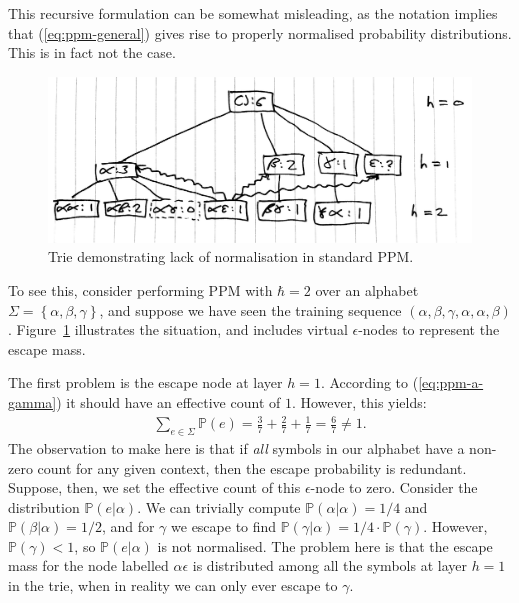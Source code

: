 \documentclass[12pt,a4paper,twoside,openright]{report}
\newcommand{\set}[1]{ \left\{ #1 \right\} }
\begin{document}
This recursive formulation can be somewhat misleading, as the notation implies
that (\ref{eq:ppm-general}) gives rise to properly normalised probability
distributions. This is in fact not the case. 

\begin{figure}[H]
\centering
\includegraphics[width=400pt]{figs/problematic_trie_tmp.jpg}
\caption{Trie demonstrating lack of normalisation in standard PPM.}
\label{fig:bad-ppm-trie}
\end{figure}

To see this, consider performing PPM with $\hbar = 2$ over an alphabet $\Sigma =
\set{\alpha,\beta,\gamma}$, and suppose we have seen the training sequence
$(\alpha,\beta,\gamma,\alpha,\alpha,\beta)$.  Figure~\ref{fig:bad-ppm-trie}
illustrates the situation, and includes virtual $\epsilon$-nodes to represent
the escape mass.

The first problem is the escape node at layer $h = 1$. According to
(\ref{eq:ppm-a-gamma}) it should have an effective count of $1$. However, this
yields:
\begin{align}
  \sum_{e \in \Sigma} \mathbb{P}(e) = \frac{3}{7} + \frac{2}{7} + \frac{1}{7} =
\frac{6}{7} \neq 1. 
\end{align} 
The observation to make here is that if \emph{all} symbols in our alphabet have
a non-zero count for any given context, then the escape probability is
redundant. Suppose, then, we set the effective count of this $\epsilon$-node to
zero. Consider the distribution $\mathbb{P}(e|\alpha)$. We can trivially compute
$\mathbb{P}(\alpha|\alpha) = 1/4$ and $\mathbb{P}(\beta|\alpha) = 1/2$, and for
$\gamma$ we escape to find $\mathbb{P}(\gamma|\alpha) = 1/4 \cdot
\mathbb{P}(\gamma)$. However, $\mathbb{P}(\gamma) < 1$, so
$\mathbb{P}(e|\alpha)$ is not normalised. The problem here is that the escape
mass for the node labelled $\alpha\epsilon$ is distributed among all the symbols
at layer $h = 1$ in the trie, when in reality we can only ever escape to
$\gamma$.
\end{document}
